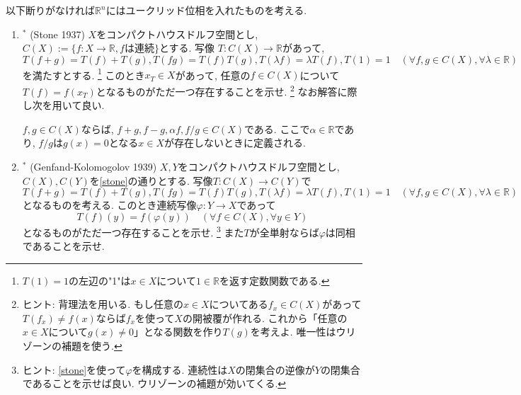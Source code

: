 \documentclass[dvipdfmx,a4paper,11pt]{article}
\newcommand{\R}{\mathbb{R}}
\theoremstyle{definition}
\begin{document}
以下断りがなければ$\R^{n}$にはユークリッド位相を入れたものを考える. 
\begin{enumerate}[label=\textbf{問}\ref*{sec-compact_continue}.\arabic*]
	\setlength{\parskip}{0cm} 
  \setlength{\itemsep}{7pt} 
\item \label{stone} $^{*}$ (Stone 1937) $X$をコンパクトハウスドルフ空間とし, $C(X):= \{ f : X \rightarrow \R, \text{$f$は連続}\}$とする. 写像
$T : C(X) \rightarrow \R$があって, 
$$
T(f + g) = T(f) + T(g), T(fg)=T(f)T(g),  T(\lambda f) = \lambda T(f), T(1)=1 \quad (\forall f,g \in C(X), \forall \lambda \in \R)
$$
を満たすとする. \footnote{$T(1) = 1$の左辺の"1"は$x \in X$について$1 \in \R$を返す定数関数である. } 
このとき$x_{T} \in X$があって, 任意の$f \in C(X)$について$T(f) = f(x_{T})$となるものがただ一つ存在することを示せ. \footnote{ヒント: 背理法を用いる. もし任意の$x \in X$についてある$f_{x} \in C(X)$があって$T(f_x) \neq f(x)$ならば$f_x$を使って$X$の開被覆が作れる. これから「任意の$x \in X$について$g(x) \neq 0$」となる関数を作り$T(g)$を考えよ. 唯一性はウリゾーンの補題を使う.}
なお解答に際し次を用いて良い.
 \begin{tcolorbox}[
    colback = white,
    colframe = green!35!black,
    fonttitle = \bfseries,
    breakable = true]
$f,g \in C(X)$ならば, $f +g, f-g, \alpha f, f/g \in C(X)$である. ここで$\alpha \in \R$であり, $f/g$は$g(x)=0$となる$x \in X$が存在しないときに定義される. 
 \end{tcolorbox}


\item $^{*}$\label{Gelfand} (Genfand-Kolomogolov 1939) $X,Y$をコンパクトハウスドルフ空間とし, $C(X), C(Y)$を\ref{stone}の通りとする.
写像$T : C(X) \rightarrow C(Y)$で
$$
T(f + g) = T(f) + T(g), T(fg)=T(f)T(g), T(\lambda f) = \lambda T(f), T(1) =1 \quad (\forall f,g \in C(X), \forall \lambda \in \R)
$$
となるものを考える.%
このとき連続写像$\varphi : Y \rightarrow X$であって
$$
T(f)(y) = f(\varphi(y)) \quad  (\forall f\in C(X), \forall y \in Y)
$$
となるものがただ一つ存在することを示せ. \footnote{ヒント: \ref{stone}を使って$\varphi$を構成する. 連続性は$X$の閉集合の逆像が$Y$の閉集合であることを示せば良い. ウリゾーンの補題が効いてくる.}
また$T$が全単射ならば$\varphi$は同相であることを示せ.


\end{enumerate}
\end{document}
